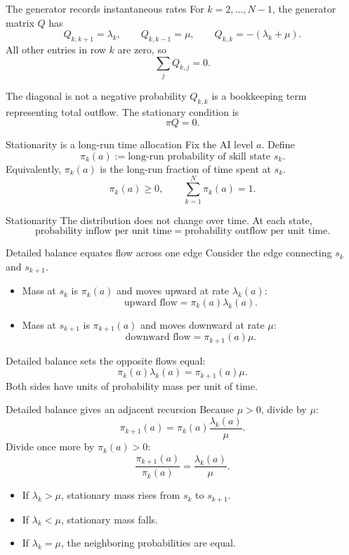 \documentclass[aspectratio=169,10pt]{beamer}
\begin{document}
\begin{frame}{The generator records instantaneous rates}
For $k=2,\ldots,N-1$, the generator matrix $Q$ has
\[
Q_{k,k+1}=\lambda_k,
\qquad
Q_{k,k-1}=\mu,
\qquad
Q_{k,k}=-(\lambda_k+\mu).
\]
All other entries in row $k$ are zero, so
\[
\sum_jQ_{k,j}=0.
\]
\begin{alertblock}{The diagonal is not a negative probability}
$Q_{k,k}$ is a bookkeeping term representing total outflow. The stationary condition is
\[
\pi Q=0.
\]
\end{alertblock}
\end{frame}

\begin{frame}{Stationarity is a long-run time allocation}
Fix the AI level $a$. Define
\[
\pi_k(a):=\text{long-run probability of skill state }s_k.
\]
Equivalently, $\pi_k(a)$ is the long-run fraction of time spent at $s_k$.
\[
\pi_k(a)\ge0,
\qquad
\sum_{k=1}^N\pi_k(a)=1.
\]
\begin{block}{Stationarity}
The distribution does not change over time. At each state,
\[
\text{probability inflow per unit time}
=
\text{probability outflow per unit time}.
\]
\end{block}
\end{frame}

\begin{frame}{Detailed balance equates flow across one edge}
Consider the edge connecting $s_k$ and $s_{k+1}$.
\begin{itemize}
  \item Mass at $s_k$ is $\pi_k(a)$ and moves upward at rate $\lambda_k(a)$:
  \[
  \text{upward flow}=\pi_k(a)\lambda_k(a).
  \]
  \item Mass at $s_{k+1}$ is $\pi_{k+1}(a)$ and moves downward at rate $\mu$:
  \[
  \text{downward flow}=\pi_{k+1}(a)\mu.
  \]
\end{itemize}
Detailed balance sets the opposite flows equal:
\[
\boxed{\pi_k(a)\lambda_k(a)=\pi_{k+1}(a)\mu.}
\]
Both sides have units of probability mass per unit of time.
\end{frame}

\begin{frame}{Detailed balance gives an adjacent recursion}
Because $\mu>0$, divide by $\mu$:
\[
\boxed{
\pi_{k+1}(a)=\pi_k(a)\frac{\lambda_k(a)}{\mu}.}
\]
Divide once more by $\pi_k(a)>0$:
\[
\boxed{
\frac{\pi_{k+1}(a)}{\pi_k(a)}
=\frac{\lambda_k(a)}{\mu}.}
\]
\begin{itemize}
  \item If $\lambda_k>\mu$, stationary mass rises from $s_k$ to $s_{k+1}$.
  \item If $\lambda_k<\mu$, stationary mass falls.
  \item If $\lambda_k=\mu$, the neighboring probabilities are equal.
\end{itemize}
\end{frame}
\end{document}
